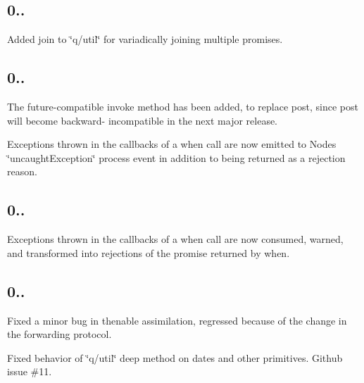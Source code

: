 \subsection*{0..}


\begin{DoxyItemize}
\item Added {\ttfamily join} to {\ttfamily \char`\"{}q/util\char`\"{}} for variadically joining multiple promises.
\end{DoxyItemize}

\subsection*{0..}


\begin{DoxyItemize}
\item The future-\/compatible {\ttfamily invoke} method has been added, to replace {\ttfamily post}, since {\ttfamily post} will become backward-\/ incompatible in the next major release.
\item Exceptions thrown in the callbacks of a {\ttfamily when} call are now emitted to Node\textquotesingle{}s {\ttfamily \char`\"{}uncaught\+Exception\char`\"{}} {\ttfamily process} event in addition to being returned as a rejection reason.
\end{DoxyItemize}

\subsection*{0..}


\begin{DoxyItemize}
\item Exceptions thrown in the callbacks of a {\ttfamily when} call are now consumed, warned, and transformed into rejections of the promise returned by {\ttfamily when}.
\end{DoxyItemize}

\subsection*{0..}


\begin{DoxyItemize}
\item Fixed a minor bug in thenable assimilation, regressed because of the change in the forwarding protocol.
\item Fixed behavior of \char`\"{}q/util\char`\"{} {\ttfamily deep} method on dates and other primitives. Github issue \#11.
\end{DoxyItemize}

